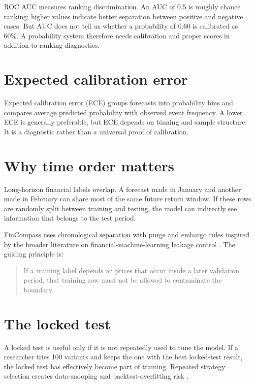 \documentclass[11pt]{article}
\begin{document}
ROC AUC measures ranking discrimination. An AUC of 0.5 is roughly chance ranking; higher values indicate better separation between positive and negative cases. But AUC does not tell us whether a probability of 0.60 is calibrated as 60\%. A probability system therefore needs calibration and proper scores in addition to ranking diagnostics.

\section{Expected calibration error}

Expected calibration error (ECE) groups forecasts into probability bins and compares average predicted probability with observed event frequency. A lower ECE is generally preferable, but ECE depends on binning and sample structure. It is a diagnostic rather than a universal proof of calibration.

\section{Why time order matters}

Long-horizon financial labels overlap. A forecast made in January and another made in February can share most of the same future return window. If these rows are randomly split between training and testing, the model can indirectly see information that belongs to the test period.

FinCompass uses chronological separation with purge and embargo rules inspired by the broader literature on financial-machine-learning leakage control \citep{lopezdeprado2018advances}. The guiding principle is:

\begin{quote}
If a training label depends on prices that occur inside a later validation period, that training row must not be allowed to contaminate the boundary.
\end{quote}

\section{The locked test}

A locked test is useful only if it is not repeatedly used to tune the model. If a researcher tries 100 variants and keeps the one with the best locked-test result, the locked test has effectively become part of training. Repeated strategy selection creates data-snooping and backtest-overfitting risk \citep{white2000reality,harvey2016crosssection,bailey2017pbo}.
\end{document}
